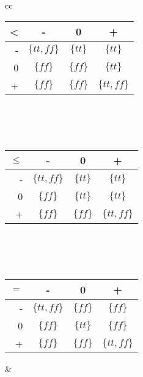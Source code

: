 \begin{table}
\begin{tabular}{cc}
    \begin{minipage}{0.4\linewidth}
		\begin{tabular}{| r | c | c | c |}
		\hline
		 <   & -   & 0 & +  \\
		\hline
		 -  & $\{tt,ff\}$ & $\{tt\}$ & $\{tt\}$  \\
		\hline
		 0  & $\{ff\}$ & $\{ff\}$ & $\{tt\}$ \\
		\hline
		 +  & $\{ff\}$ & $\{ff\}$ & $\{tt,ff\}$ \\
		 \hline
		\end{tabular}
		\\\\\\
		\begin{tabular}{| r | c | c | c |}
		\hline
		 $\leq$   & -   & 0 & +  \\
		\hline
		 -  & $\{tt,ff\}$ & $\{tt\}$ & $\{tt\}$  \\
		\hline
		 0  & $\{ff\}$ & $\{tt\}$ & $\{tt\}$ \\
		\hline
		 +  & $\{ff\}$ & $\{ff\}$ & $\{tt,ff\}$ \\
		 \hline
		\end{tabular}
		\\\\\\
		\begin{tabular}{| r | c | c | c |}
		\hline
		 $=$   & -   & 0 & +  \\
		\hline
		 -  & $\{tt,ff\}$ & $\{ff\}$ & $\{ff\}$  \\
		\hline
		 0  & $\{ff\}$ & $\{tt\}$ & $\{ff\}$ \\
		\hline
		 +  & $\{ff\}$ & $\{ff\}$ & $\{tt,ff\}$ \\
		 \hline
		\end{tabular}
    \end{minipage} &


\end{tabular}
\end{table}
